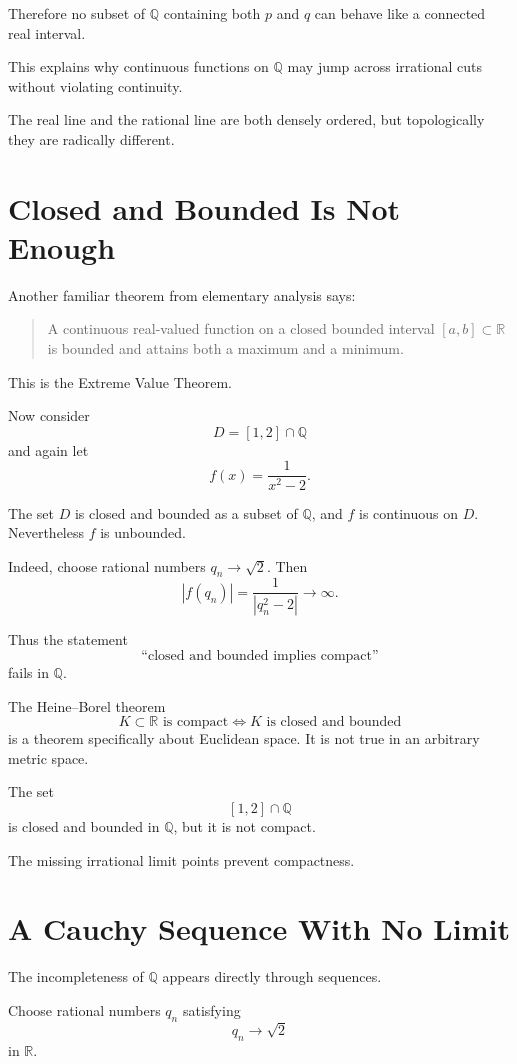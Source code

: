 \documentclass{essay}
\begin{document}
Therefore no subset of \(\mathbb{Q}\) containing both \(p\) and \(q\) can
behave like a connected real interval.

This explains why continuous functions on \(\mathbb{Q}\) may jump across
irrational cuts without violating continuity.

The real line and the rational line are both densely ordered, but topologically
they are radically different.

\section{Closed and Bounded Is Not Enough}

Another familiar theorem from elementary analysis says:

\begin{quote}
A continuous real-valued function on a closed bounded interval
\([a,b]\subset\mathbb{R}\) is bounded and attains both a maximum and a minimum.
\end{quote}

This is the Extreme Value Theorem.

Now consider
\[
D=[1,2]\cap\mathbb{Q}
\]
and again let
\[
f(x)=\frac{1}{x^2-2}.
\]

The set \(D\) is closed and bounded as a subset of \(\mathbb{Q}\), and \(f\) is
continuous on \(D\). Nevertheless \(f\) is unbounded.

Indeed, choose rational numbers \(q_n\to\sqrt{2}\). Then
\[
|f(q_n)|
=
\frac{1}{|q_n^2-2|}
\to\infty.
\]

Thus the statement
\[
\text{``closed and bounded implies compact''}
\]
fails in \(\mathbb{Q}\).

The Heine--Borel theorem
\[
K\subset\mathbb{R}
\text{ is compact}
\iff
K\text{ is closed and bounded}
\]
is a theorem specifically about Euclidean space. It is not true in an
arbitrary metric space.

The set
\[
[1,2]\cap\mathbb{Q}
\]
is closed and bounded in \(\mathbb{Q}\), but it is not compact.

The missing irrational limit points prevent compactness.

\section{A Cauchy Sequence With No Limit}

The incompleteness of \(\mathbb{Q}\) appears directly through sequences.

Choose rational numbers \(q_n\) satisfying
\[
q_n\to\sqrt{2}
\]
in \(\mathbb{R}\).
\end{document}
